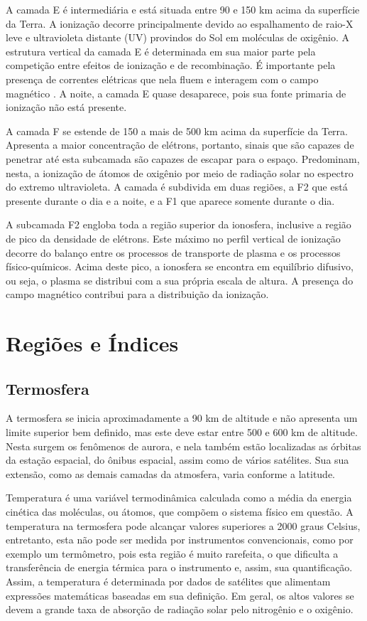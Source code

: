 A camada E é intermediária e está situada entre 90 e 150 km acima da superfície da Terra. A ionização decorre principalmente devido ao espalhamento de raio-X leve e ultravioleta distante (UV) provindos do Sol em moléculas de oxigênio. A estrutura vertical da camada E é determinada em sua maior parte pela competição entre efeitos de ionização e de recombinação. É importante pela presença de correntes elétricas que nela fluem e interagem com o campo magnético \cite{KIRCHHOFF:1991}. A noite, a camada E quase desaparece, pois sua fonte primaria de ionização não está presente.

A camada F se estende de 150 a mais de 500 km acima da superfície da Terra. Apresenta a maior concentração de elétrons, portanto, sinais que são capazes de penetrar até esta subcamada são capazes de escapar para o espaço. Predominam, nesta, a ionização de átomos de oxigênio por meio de radiação solar no espectro do extremo ultravioleta. A camada é subdivida em duas regiões, a F2 que está presente durante o dia e a noite, e a F1 que aparece somente durante o dia. 

A subcamada F2 engloba toda a região superior da ionosfera, inclusive a região de pico da densidade de elétrons. Este máximo no perfil vertical de ionização decorre do balanço entre os processos de transporte de plasma e os processos físico-químicos. Acima deste pico, a ionosfera se encontra em equilíbrio difusivo, ou seja, o plasma se distribui com a sua própria escala de altura. A presença do campo magnético contribui para a distribuição da ionização.

\section{Regiões e Índices}

\subsection{Termosfera}

A termosfera se inicia aproximadamente a 90 km de altitude e não apresenta um limite superior bem definido, mas este deve estar entre 500 e 600 km de altitude. Nesta surgem os fenômenos de aurora, e nela também estão localizadas as órbitas da estação espacial, do ônibus espacial, assim como de vários satélites. Sua sua extensão, como as demais camadas da atmosfera, varia conforme a latitude. 

Temperatura é uma variável termodinâmica calculada como a média da energia cinética das moléculas, ou átomos, que compõem o sistema físico em questão. A temperatura na termosfera pode alcançar valores superiores a 2000 graus Celsius, entretanto, esta não pode ser medida por instrumentos convencionais, como por exemplo um termômetro, pois esta região é muito rarefeita, o que dificulta a transferência de energia térmica para o instrumento e, assim, sua quantificação. Assim, a temperatura é determinada por dados de satélites que alimentam expressões matemáticas baseadas em sua definição. Em geral, os altos valores se devem a grande taxa de absorção de radiação solar pelo nitrogênio e o oxigênio.

